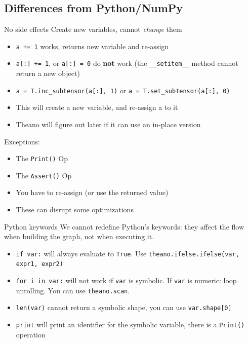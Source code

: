 \documentclass[a4paper,9pt]{beamer}
\begin{document}
\subsection{Differences from Python/NumPy}
\begin{frame}[fragile]{No side effects}
  Create new variables, cannot {\em change} them
  \begin{itemize}
    \item \verb|a += 1| works, returns new variable and re-assign
    \item \verb|a[:] += 1|, or \verb|a[:] = 0| do {\bf not} work
      (the \verb|__setitem__| method cannot return a new object)
    \item \verb|a = T.inc_subtensor(a[:], 1)| or \verb|a = T.set_subtensor(a[:], 0)|
    \item This will create a new variable, and re-assign a to it
    \item Theano will figure out later if it can use an in-place version
  \end{itemize}
  Exceptions:
  \begin{itemize}
    \item The \verb|Print()| Op
    \item The \verb|Assert()| Op
    \item You have to re-assign (or use the returned value)
    \item These can disrupt some optimizations
  \end{itemize}
\end{frame}

\begin{frame}[fragile]{Python keywords}
  We cannot redefine Python's keywords: they affect the flow when building the graph, not when executing it.
  \begin{itemize}
    \item \verb|if var:| will always evaluate to \verb|True|.
      Use \verb|theano.ifelse.ifelse(var, expr1, expr2)|
    \item \verb|for i in var:| will not work if \verb|var| is symbolic.
      If \verb|var| is numeric: loop unrolling. You can use \verb|theano.scan|.
    \item \verb|len(var)| cannot return a symbolic shape, you can use
      \verb|var.shape[0]|
    \item \verb|print| will print an identifier for the symbolic variable,
      there is a \verb|Print()| operation
  \end{itemize}
\end{frame}
\end{document}
